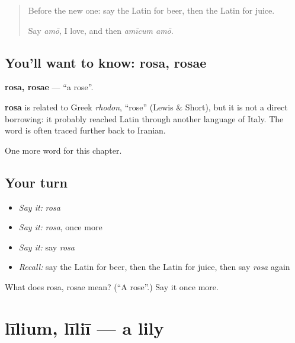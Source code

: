 \label{lesson:LA-C128-rosa}



\begin{quote}
Before the new one: say the Latin for beer, then the Latin for juice.

Say \emph{amō}, I love, and then \emph{amīcum amō}.
\end{quote}

\subsection*{You'll want to know: rosa, rosae}
\textbf{rosa, rosae} — \textquotedblleft{}a rose\textquotedblright{}.

\begin{cousinweb}
\textbf{rosa} is related to Greek \emph{rhodon}, \textquotedblleft{}rose\textquotedblright{} (Lewis \& Short), but it is not a direct borrowing: it probably reached Latin through another language of Italy. The word is often traced further back to Iranian.
\end{cousinweb}

\begin{grammarlens}[title={What you've built}]
One more word for this chapter.
\end{grammarlens}

\subsection*{Your turn}
\begin{itemize}
\raggedright
  \item \emph{Say it:} \emph{rosa}
  \item \emph{Say it:} \emph{rosa}, once more
  \item \emph{Say it:} say \emph{rosa}
  \item \emph{Recall:} say the Latin for beer, then the Latin for juice, then say \emph{rosa} again
\end{itemize}

\begin{tcolorbox}[breakable,colback=teal!4,colframe=teal!35!black,title={Before you move on}]
What does rosa, rosae mean? (\textquotedblleft{}A rose\textquotedblright{}.) Say it once more.
\end{tcolorbox}
\section[līlium, līliī]{līlium, līliī — a lily}

